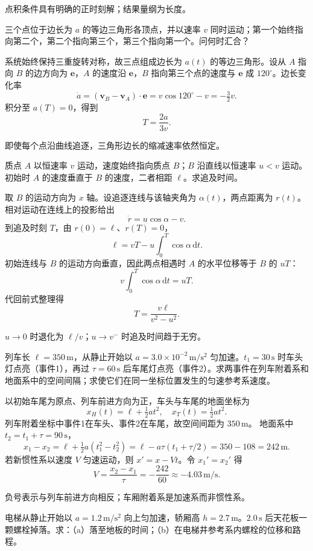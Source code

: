 \excheck
点积条件具有明确的正时刻解；结果量纲为长度。


三个点位于边长为 $a$ 的等边三角形各顶点，并以速率 $v$ 同时运动；第一个始终指向第二个，第二个指向第三个，第三个指向第一个。问何时汇合？

\exsolution
系统始终保持三重旋转对称，故三点组成边长为 $a(t)$ 的等边三角形。设从 $A$ 指向 $B$ 的边方向为 $\bm e$，$A$ 的速度沿 $\bm e$，$B$ 指向第三个点的速度与 $\bm e$ 成 $120^\circ$。边长变化率
\[
\dot a=(\bm v_B-\bm v_A)\cdot\bm e
=v\cos120^\circ-v=-\tfrac32v.
\]
积分至 $a(T)=0$，得到
\[
\boxed{T=\frac{2a}{3v}.}
\]

\excheck
即使每个点沿曲线追逐，三角形边长的缩减速率依然恒定。


质点 $A$ 以恒速率 $v$ 运动，速度始终指向质点 $B$；$B$ 沿直线以恒速率 $u<v$ 运动。初始时 $A$ 的速度垂直于 $B$ 的速度，二者相距 $\ell$。求追及时间。

\exsolution
取 $B$ 的运动方向为 $x$ 轴。设追逐连线与该轴夹角为 $\alpha(t)$，两点距离为 $r(t)$。相对运动在连线上的投影给出
\[
\dot r=u\cos\alpha-v.
\]
到追及时刻 $T$，由 $r(0)=\ell$、$r(T)=0$，
\[
\ell=vT-u\int_0^T\cos\alpha\,\mathrm dt.
\]
初始连线与 $B$ 的运动方向垂直，因此两点相遇时 $A$ 的水平位移等于 $B$ 的 $uT$：
\[
v\int_0^T\cos\alpha\,\mathrm dt=uT.
\]
代回前式整理得
\[
\boxed{T=\frac{v\ell}{v^2-u^2}.}
\]

\excheck
$u\to0$ 时退化为 $\ell/v$；$u\to v^-$ 时追及时间趋于无穷。


列车长 $\ell=350\,\mathrm m$，从静止开始以 $a=3.0\times10^{-2}\,\mathrm{m/s^2}$ 匀加速。$t_1=30\,\mathrm s$ 时车头灯点亮（事件1），再过 $\tau=60\,\mathrm s$ 后车尾灯点亮（事件2）。求两事件在列车附着系和地面系中的空间间隔；求使它们在同一坐标位置发生的匀速参考系速度。

\exsolution
以初始车尾为原点、列车前进方向为正，车头与车尾的地面坐标为
\[
x_H(t)=\ell+\tfrac12at^2,\quad x_T(t)=\tfrac12at^2.
\]
列车附着坐标中事件1在车头、事件2在车尾，故空间间距为 $\boxed{350\,\mathrm m}$。
地面系中 $t_2=t_1+\tau=90\,\mathrm s$，
\[
x_1-x_2=\ell+\tfrac12a(t_1^2-t_2^2)
=\ell-a\tau(t_1+\tau/2)
=350-108=\boxed{242\,\mathrm m}.
\]
若新惯性系以速度 $V$ 匀速运动，则 $x'=x-Vt$。令 $x_1'=x_2'$ 得
\[
\boxed{V=\frac{x_2-x_1}{\tau}=-\frac{242}{60}
\approx-4.03\,\mathrm{m/s}.}
\]

\excheck
负号表示与列车前进方向相反；车厢附着系是加速系而非惯性系。


电梯从静止开始以 $a=1.2\,\mathrm{m/s^2}$ 向上匀加速，轿厢高 $h=2.7\,\mathrm m$。$2.0\,\mathrm s$ 后天花板一颗螺栓掉落。求：（a）落至地板的时间；（b）在电梯井参考系内螺栓的位移和路程。

